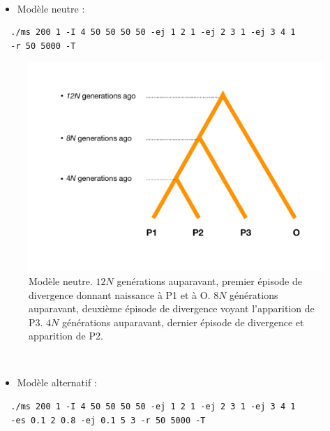 \documentclass[12pt,twoside]{ugathesis}
\providecommand{\tightlist}{%
  \setlength{\itemsep}{0pt}\setlength{\parskip}{0pt}}
\begin{document}
  ~
  \begin{itemize}
  \tightlist
  \item
    Modèle neutre :
  \end{itemize}
  \begin{verbatim}
  ./ms 200 1 -I 4 50 50 50 50 -ej 1 2 1 -ej 2 3 1 -ej 3 4 1 
  -r 50 5000 -T 
  \end{verbatim}
  \begin{figure}
  
  {\centering \includegraphics[scale=0.5]{figure/background} 
  
  }
  
  \caption{Modèle neutre. $12N$ genérations auparavant, premier épisode de divergence donnant naissance à P1 et à O. $8N$ générations auparavant, deuxième épisode de divergence voyant l'apparition de P3. $4N$ générations auparavant, dernier épisode de divergence et apparition de P2.}\label{fig:background}
  \end{figure}
  ~
  \begin{itemize}
  \tightlist
  \item
    Modèle alternatif :
  \end{itemize}
  \begin{verbatim}
  ./ms 200 1 -I 4 50 50 50 50 -ej 1 2 1 -ej 2 3 1 -ej 3 4 1 
  -es 0.1 2 0.8 -ej 0.1 5 3 -r 50 5000 -T
  \end{verbatim}
\end{document}
